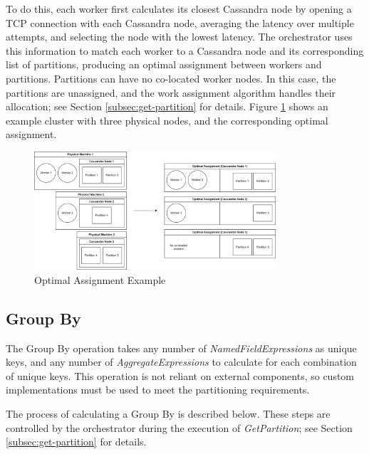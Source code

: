 To do this, each worker first calculates its closest Cassandra node by opening a TCP connection with each Cassandra node, averaging the latency over multiple attempts, and selecting the node with the lowest latency. The orchestrator uses this information to match each worker to a Cassandra node and its corresponding list of partitions, producing an optimal assignment between workers and partitions. Partitions can have no co-located worker nodes. In this case, the partitions are unassigned, and the work assignment algorithm handles their allocation; see Section \ref{subsec:get-partition} for details. Figure \ref{fig:optimal-assignment-example} shows an example cluster with three physical nodes, and the corresponding optimal assignment.

\begin{figure}[h]
	\centering
	\includegraphics[width=0.8\textwidth]{chapters/diagrams/implementation/optimal-assignment-example}
	\caption{Optimal Assignment Example}
	\label{fig:optimal-assignment-example}
\end{figure}

\subsection{Group By}\label{subsec:group-by}
The Group By operation takes any number of \textit{NamedFieldExpressions} as unique keys, and any number of \textit{AggregateExpressions} to calculate for each combination of unique keys. This operation is not reliant on external components, so custom implementations must be used to meet the partitioning requirements.

The process of calculating a Group By is described below. These steps are controlled by the orchestrator during the execution of \textit{GetPartition}; see Section \ref{subsec:get-partition} for details.

